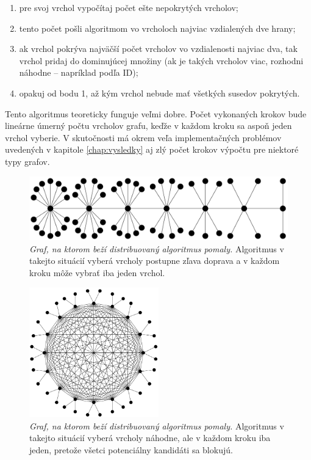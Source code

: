 \begin{enumerate}
	\item pre svoj vrchol vypočítaj počet ešte nepokrytých vrcholov;
	\item tento počet pošli algoritmom vo vrcholoch najviac vzdialených dve 
		hrany;
	\item ak vrchol pokrýva najväčší počet vrcholov vo vzdialenosti najviac 
		dva, tak vrchol pridaj do dominujúcej množiny (ak je takých vrcholov 
		viac, rozhodni náhodne -- napríklad podľa ID);
	\item opakuj od bodu 1, až kým vrchol nebude mať všetkých susedov 
		pokrytých.
\end{enumerate}

Tento algoritmus teoreticky funguje veľmi dobre. Počet vykonaných krokov bude 
lineárne úmerný počtu vrcholov grafu, keďže v každom kroku sa aspoň jeden 
vrchol vyberie. V skutočnosti má okrem veľa implementačných problémov uvedených 
v kapitole \ref{chap:vysledky} aj zlý počet krokov výpočtu pre niektoré typy 
grafov.

\begin{figure}
	\centering
	\includegraphics[width=1.0\textwidth]{obrazky/zle1}
	\caption{\emph{Graf, na ktorom beží distribuovaný algoritmus pomaly.} 
		Algoritmus v takejto situácií vyberá vrcholy postupne zľava doprava 
		a v každom kroku môže vybrať iba jeden vrchol.}
	\label{img:zle1}
\end{figure}

\begin{figure}
	\centering
	\includegraphics[width=0.5\textwidth]{obrazky/zle2}
	\caption{\emph{Graf, na ktorom beží distribuovaný algoritmus pomaly.} 
		Algoritmus v takejto situácií vyberá vrcholy náhodne, ale v každom 
		kroku iba jeden, pretože všetci potenciálny kandidáti sa blokujú.}
	\label{img:zle2}
\end{figure}


